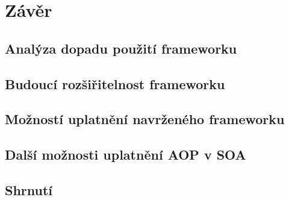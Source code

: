 
\chapter{Z\'av\v er}\label{ch:zaver}

\section{Analýza dopadu použití frameworku}

\section{Budoucí rozšiřitelnost frameworku}

\section{Možností uplatnění navrženého frameworku}

\section{Další možnosti uplatnění AOP v SOA}

\section{Shrnutí}
